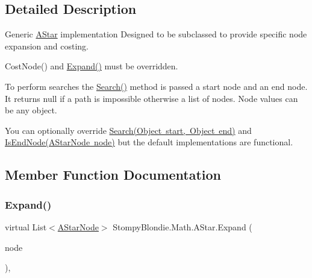 \subsection{Detailed Description}
Generic \mbox{\hyperlink{class_stompy_blondie_1_1_math_1_1_a_star}{A\+Star}} implementation Designed to be subclassed to provide specific node expansion and costing.

{\ttfamily Cost\+Node()} and {\ttfamily \mbox{\hyperlink{class_stompy_blondie_1_1_math_1_1_a_star_a1ab565fca68068ebbf331736a144ead9}{Expand()}}} must be overridden.

To perform searches the {\ttfamily \mbox{\hyperlink{class_stompy_blondie_1_1_math_1_1_a_star_abba11aaec721f3d70f8998d64ccdb299}{Search()}}} method is passed a start node and an end node. It returns null if a path is impossible otherwise a list of nodes. Node values can be any object.

You can optionally override {\ttfamily \mbox{\hyperlink{class_stompy_blondie_1_1_math_1_1_a_star_abba11aaec721f3d70f8998d64ccdb299}{Search(\+Object start, Object end)}}} and {\ttfamily \mbox{\hyperlink{class_stompy_blondie_1_1_math_1_1_a_star_a310801f602808b6cf4d7cb468a825442}{Is\+End\+Node(\+A\+Star\+Node node)}}} but the default implementations are functional. 

\subsection{Member Function Documentation}
\mbox{\label{class_stompy_blondie_1_1_math_1_1_a_star_a1ab565fca68068ebbf331736a144ead9}} 
\subsubsection{\texorpdfstring{Expand()}{Expand()}}
{\footnotesize\ttfamily virtual List$<$\mbox{\hyperlink{class_stompy_blondie_1_1_math_1_1_a_star_node}{A\+Star\+Node}}$>$ Stompy\+Blondie.\+Math.\+A\+Star.\+Expand (\begin{DoxyParamCaption}\item[{\mbox{\hyperlink{class_stompy_blondie_1_1_math_1_1_a_star_node}{A\+Star\+Node}}}]{node }\end{DoxyParamCaption})\hspace{0.3cm}{\ttfamily [inline]}, {\ttfamily [virtual]}}

